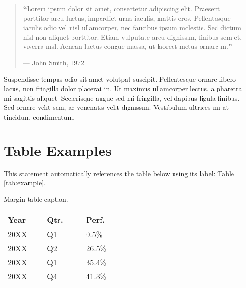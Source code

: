 \documentclass[
	letterpaper, %
	12pt, %
]{CSSullivanBusinessReport}
\begin{document}
\begin{quote}
	\textbf{\LARGE ``}Lorem ipsum dolor sit amet, consectetur adipiscing elit. Praesent porttitor arcu luctus, imperdiet urna iaculis, mattis eros. Pellentesque iaculis odio vel nisl ullamcorper, nec faucibus ipsum molestie. Sed dictum nisl non aliquet porttitor. Etiam vulputate arcu dignissim, finibus sem et, viverra nisl. Aenean luctus congue massa, ut laoreet metus ornare in.\textbf{''}
	
	\hfill--- John Smith, 1972
\end{quote}

Suspendisse tempus odio sit amet volutpat suscipit. Pellentesque ornare libero lacus, non fringilla dolor placerat in. Ut maximus ullamcorper lectus, a pharetra mi sagittis aliquet. Scelerisque augue sed mi fringilla, vel dapibus ligula finibus. Sed ornare velit sem, ac venenatis velit dignissim. Vestibulum ultrices mi at tincidunt condimentum.


\section{Table Examples}

This statement automatically references the table below using its label: Table \ref{tab:example}.


\begin{margintable} %
	\footnotesize %
	\caption{Margin table caption.}
	\begin{tabular}{L{0.22\linewidth} C{0.22\linewidth} R{0.25\linewidth}}
		\toprule
		\textbf{Year} & \textbf{Qtr.} & \textbf{Perf.}\\
		\midrule
		20XX & Q1 & 0.5\%\\
		20XX & Q2 & 26.5\%\\
		20XX & Q1 & 35.4\%\\
		20XX & Q4 & 41.3\%\\
		\bottomrule
	\end{tabular}
\end{margintable}

\end{document}
